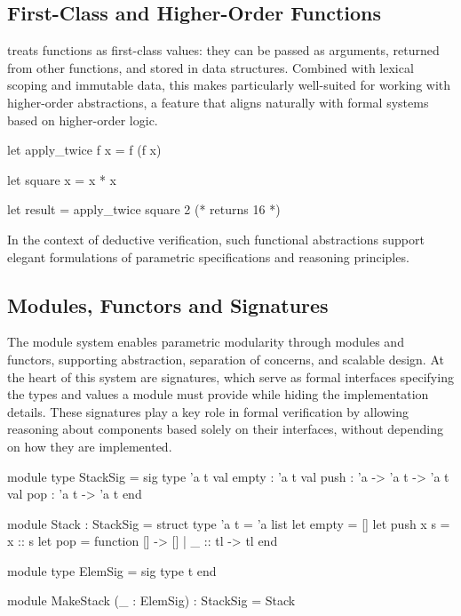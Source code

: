 \subsection{First-Class and Higher-Order Functions}

\ocaml treats functions as first-class values: they can be passed as arguments, returned from other functions, 
and stored in data structures. Combined with lexical scoping and immutable data, this makes \ocaml particularly 
well-suited for working with higher-order abstractions, a feature that aligns naturally with formal systems based on 
higher-order logic.

\begin{ocamlenv}
  let apply_twice f x = f (f x)

  let square x = x * x

  let result = apply_twice square 2  (* returns 16 *)
\end{ocamlenv}

In the context of deductive verification, such functional abstractions support elegant formulations of parametric specifications 
and reasoning principles.

\subsection{Modules, Functors and Signatures}

The module system enables parametric modularity through modules and functors, supporting abstraction, separation of concerns, and 
scalable design. At the heart of this system are signatures, which serve as formal interfaces specifying the types and values a 
module must provide while hiding the implementation details. These signatures play a key role in formal verification by allowing 
reasoning about components based solely on their interfaces, without depending on how they are implemented.

\begin{ocamlenv}
  module type StackSig = sig
    type 'a t
    val empty : 'a t
    val push : 'a -> 'a t -> 'a t
    val pop : 'a t -> 'a t
  end

  module Stack : StackSig = struct
    type 'a t = 'a list
    let empty = []
    let push x s = x :: s
    let pop = function [] -> [] | _ :: tl -> tl
  end

  module type ElemSig = sig type t end

  module MakeStack (_ : ElemSig) : StackSig = Stack
\end{ocamlenv}

